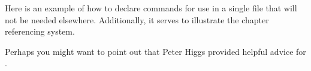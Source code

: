 \DeclareRobustCommand{\personPH}{Peter Higgs\xspace}

Here is an example of how to declare commands for use in a single file that will not be needed elsewhere.
Additionally, it serves to illustrate the chapter referencing system.

Perhaps you might want to point out that \personPH provided helpful advice for .